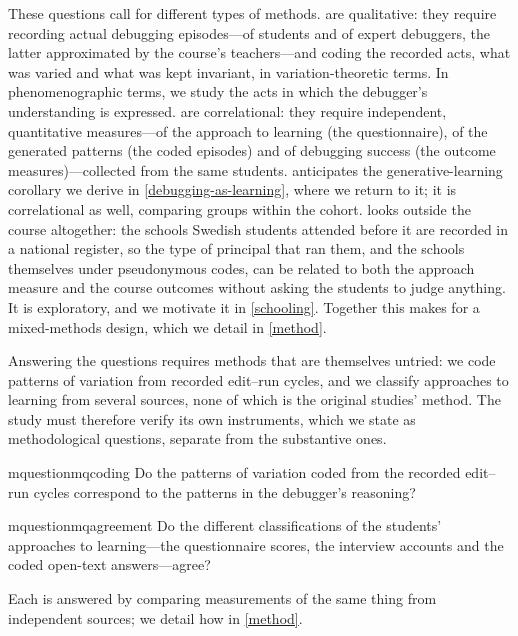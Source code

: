 These questions call for different types of methods.
 are qualitative: they require recording actual
debugging episodes---of students and of expert debuggers, the latter
approximated by the course's teachers---and coding the recorded acts, what
was varied and what was kept invariant, in variation-theoretic terms.
In phenomenographic terms, we study the acts in which the debugger's
understanding is expressed.
 are correlational: they require independent,
quantitative measures---of the approach to learning (the questionnaire), of
the generated patterns (the coded episodes) and of debugging success (the
outcome measures)---collected from the same students.
 anticipates the generative-learning corollary we
derive in \cref{debugging-as-learning}, where we return to it; it is
correlational as well, comparing groups within the cohort.
 looks outside the course altogether: the schools Swedish
students attended before it are recorded in a national register, so the
type of principal that ran them, and the schools themselves under
pseudonymous codes, can be related to both the approach measure and the
course outcomes without asking the students to judge anything.
It is exploratory, and we motivate it in \cref{schooling}.
Together this makes for a mixed-methods design, which we detail in
\cref{method}.

Answering the questions requires methods that are themselves untried: we
code patterns of variation from recorded edit--run cycles, and we
classify approaches to learning from several sources, none of which is
the original studies' method.
The study must therefore verify its own instruments, which we state as
methodological questions, separate from the substantive ones.
\begin{frame}
\begin{restatable}{mquestion}{mqcoding}\label{mq:coding}
  Do the patterns of variation coded from the recorded edit--run cycles
  correspond to the patterns in the debugger's reasoning?
\end{restatable}
\begin{restatable}{mquestion}{mqagreement}\label{mq:agreement}
  Do the different classifications of the students' approaches to
  learning---the questionnaire scores, the interview accounts and the
  coded open-text answers---agree?
\end{restatable}
\end{frame}
Each is answered by comparing measurements of the same thing from
independent sources; we detail how in \cref{method}.

